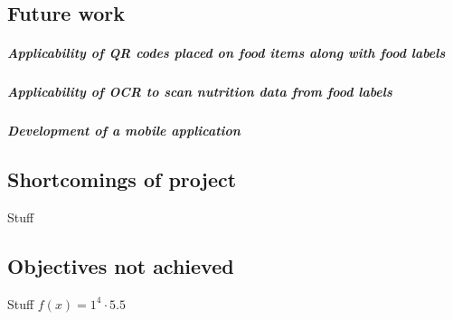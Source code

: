 \documentclass[11pt]{article}
\begin{document}
	\subsection{Future work}
		\subparagraph{Applicability of QR codes placed on food items along with food 				labels}
		\subparagraph{Applicability of OCR to scan nutrition data from food labels}
		\subparagraph{Development of a mobile application}
	\subsection{Shortcomings of project}
	Stuff	
	\subsection{Objectives not achieved}
	Stuff
	$f(x)=1^4\cdot5.5$
\pagebreak

\end{document}
